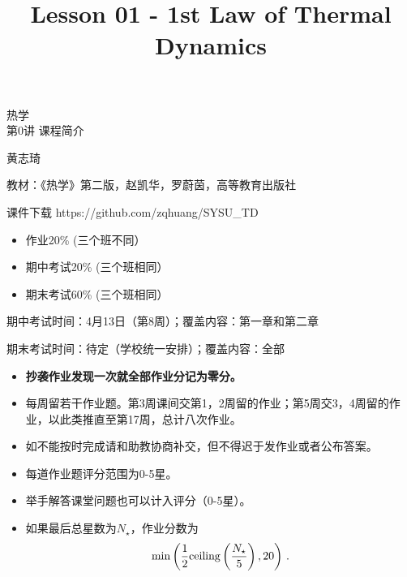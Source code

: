 \documentclass[CJK]{beamer}
\title{Lesson 01 - 1st Law of Thermal Dynamics}
\author{}
\date{}
\begin{document}
\begin{frame}
\begin{center}
\begin{Large}
\bch
热学 \\
第0讲 课程简介

{\vskip 0.3in}

黄志琦

\ech
\end{Large}
\end{center}

\vskip 0.2in

\bch
教材：《热学》第二版，赵凯华，罗蔚茵，高等教育出版社
\ech

\bch
课件下载
\ech
https://github.com/zqhuang/SYSU\_TD
\end{frame}




\begin{frame}
\bch

\begin{itemize}
\item{作业20\% (三个班不同）}
\item{期中考试20\% (三个班相同）}
\item{期末考试60\% (三个班相同）}
\end{itemize}

\skipline

期中考试时间：4月13日（第8周）；覆盖内容：第一章和第二章

期末考试时间：待定（学校统一安排）；覆盖内容：全部
\ech
\end{frame}


\begin{frame}
\bch
\begin{itemize}
\item{{\bf 抄袭作业发现一次就全部作业分记为零分。}}
\item{每周留若干作业题。第3周课间交第1，2周留的作业；第5周交3，4周留的作业，以此类推直至第17周，总计八次作业。}
\item{如不能按时完成请和助教协商补交，但不得迟于发作业或者公布答案。}
\item{每道作业题评分范围为0-5星。}
\item{举手解答课堂问题也可以计入评分（0-5星）。}
\item{如果最后总星数为$N_\star$，作业分数为
$$ \min\left( \frac{1}{2}{\rm ceiling}\left(\frac{N_\star}{5}\right), 20\right) \, . $$}
\end{itemize}

\ech
\end{frame}
\end{document}
